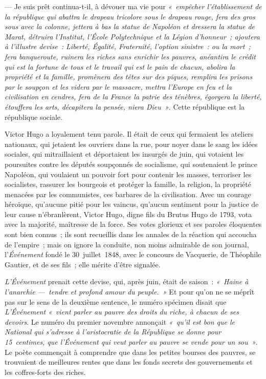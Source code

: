 \documentclass[french,twoside]{book} %
\begin{document}
— Je suis prêt continua-t-il, à dévouer ma vie pour \emph{« empêcher l’établissement de la république qui abattra le drapeau tricolore sous le drapeau rouge, fera des gros sous avec la colonne, jettera à bas la statue de Napoléon et dressera la statue de Marat, détruira l’Institut, l’École Polytechnique et la Légion d’honneur ; ajoutera à l’illustre devise : {\itshape Liberté, Égalité, Fraternité}, l’option sinistre : {\itshape ou la mort} ; fera banqueroute, ruinera les riches sans enrichir les pauvres, anéantira le crédit qui est la fortune de tous et le travail qui est le pain de chacun, abolira la propriété et la famille, promènera des têtes sur des piques, remplira les prisons par le soupçon et les videra par le massacre, mettra l’Europe en feu et la civilisation en cendres, fera de la France la patrie des ténèbres, égorgera la liberté, étouffera les arts, décapitera la pensée, niera Dieu »}. Cette république est la république sociale.\par
Victor Hugo a loyalement tenu parole. Il était de ceux qui fermaient les ateliers nationaux, qui jetaient les ouvriers dans la rue, pour noyer dans le sang les idées sociales, qui mitraillaient et déportaient les insurgés de juin, qui votaient les poursuites contre les députés soupçonnés de socialisme, qui soutenaient le prince Napoléon, qui voulaient un pouvoir fort pour contenir les masses, terroriser les  
\label{p28}socialistes, rassurer les bourgeois et protéger la famille, la religion, la propriété menacées par les communistes, ces barbares de la civilisation. Avec un courage héroïque, qu’aucune pitié pour les vaincus, qu’aucun sentiment pour la justice de leur cause n’ébranlèrent, Victor Hugo, digne fils du Brutus Hugo de 1793, vota avec la majorité, maîtresse de la force. Ses votes glorieux et ses paroles éloquentes sont bien connus ; ils sont recueillis dans les annales de la réaction qui accoucha de l’empire ; mais on ignore la conduite, non moins admirable de son journal, l’\emph{Événement} fondé le 30 juillet 1848, avec le concours de Vacquerie, de Théophile Gautier, et de ses fils ; elle mérite d’être signalée.\par
\emph{L’Événement} prenait cette devise, qui, après juin, était de saison : \emph{« Haine à l’anarchie — tendre et profond amour du peuple. »} Et pour qu’on ne se méprît pas sur le sens de la deuxième sentence, le numéro spécimen disait que \emph{L’Événement} \emph{« vient parler au pauvre des droits du riche, à chacun de ses devoirs}. Le numéro du premier novembre annonçait \emph{« qu’il est bon que le \emph{National} qui s’adresse à l’aristocratie de la République se donne pour 15 centimes, que l’\emph{Événement} qui veut parler au pauvre se vende pour un sou »}. Le poète commençait à comprendre que dans les petites bourses des pauvres, se trouvaient de meilleures rentes que dans les fonds secrets des gouvernements et les coffres-forts des riches.\par
\end{document}
